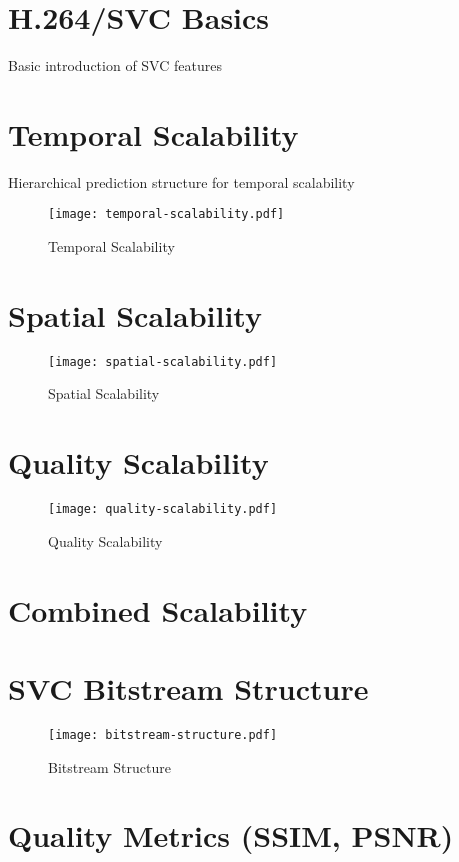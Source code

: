 
\section{H.264/SVC Basics}
Basic introduction of SVC features

\section{Temporal Scalability}
Hierarchical prediction structure for temporal scalability

    \begin{figure}[H]
        \centering
        \texttt{[image: temporal-scalability.pdf]}
        \caption{Temporal Scalability}
        \label{fig:temporal-scalability}
    \end{figure}

\section{Spatial Scalability}
    \begin{figure}[H]
        \centering
        \texttt{[image: spatial-scalability.pdf]}
        \caption{Spatial Scalability}
        \label{fig:spatial-scalability}
    \end{figure}
    
\section{Quality Scalability}
    \begin{figure}[H]
        \centering
        \texttt{[image: quality-scalability.pdf]}
        \caption{Quality Scalability}
        \label{fig:quality-scalability}
    \end{figure}
    
\section{Combined Scalability}
\label{sec:combined-scalability}
\section{SVC Bitstream Structure}
\label{sec:svc-bitstream-structure}
    \begin{figure}[H]
        \centering
        \texttt{[image: bitstream-structure.pdf]}
        \caption{Bitstream Structure}
        \label{fig:svc-bitstream-structure}
    \end{figure}


\section{Quality Metrics (SSIM, PSNR)}

